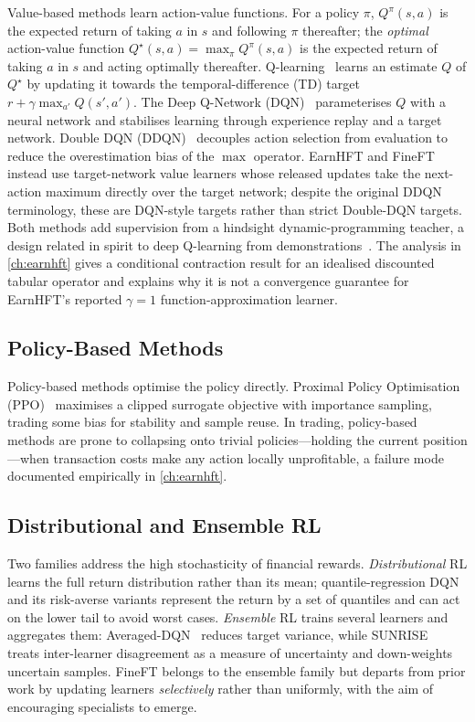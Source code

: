 Value-based methods learn action-value functions. For a policy $\pi$, $Q^\pi(s,a)$ is the expected return of taking $a$ in $s$ and following $\pi$ thereafter; the \emph{optimal} action-value function $Q^\star(s,a)=\max_\pi Q^\pi(s,a)$ is the expected return of taking $a$ in $s$ and acting optimally thereafter. Q-learning~\cite{watkins1992qlearning} learns an estimate $Q$ of $Q^\star$ by updating it towards the temporal-difference (TD) target $r+\gamma\max_{a'}Q(s',a')$. The Deep Q-Network (DQN)~\cite{mnih2015human} parameterises $Q$ with a neural network and stabilises learning through experience replay and a target network. Double DQN (DDQN)~\cite{van2016deep} decouples action selection from evaluation to reduce the overestimation bias of the $\max$ operator. EarnHFT and FineFT instead use target-network value learners whose released updates take the next-action maximum directly over the target network; despite the original DDQN terminology, these are DQN-style targets rather than strict Double-DQN targets. Both methods add supervision from a hindsight dynamic-programming teacher, a design related in spirit to deep Q-learning from demonstrations~\cite{hester2018dqfd}. The analysis in \cref{ch:earnhft} gives a conditional contraction result for an idealised discounted tabular operator and explains why it is not a convergence guarantee for EarnHFT's reported $\gamma=1$ function-approximation learner.

\subsection{Policy-Based Methods}
\label{sec:bg_policy}

Policy-based methods optimise the policy directly. Proximal Policy Optimisation (PPO)~\cite{schulman2017proximal} maximises a clipped surrogate objective with importance sampling, trading some bias for stability and sample reuse. In trading, policy-based methods are prone to collapsing onto trivial policies---holding the current position---when transaction costs make any action locally unprofitable, a failure mode documented empirically in \cref{ch:earnhft}.

\subsection{Distributional and Ensemble RL}
\label{sec:bg_dist_ensemble}

Two families address the high stochasticity of financial rewards. \emph{Distributional} RL learns the full return distribution rather than its mean; quantile-regression DQN~\cite{dabney2018distributional} and its risk-averse variants represent the return by a set of quantiles and can act on the lower tail to avoid worst cases. \emph{Ensemble} RL trains several learners and aggregates them: Averaged-DQN~\cite{anschel2017averaged} reduces target variance, while SUNRISE~\cite{lee2021sunrise} treats inter-learner disagreement as a measure of uncertainty and down-weights uncertain samples. FineFT belongs to the ensemble family but departs from prior work by updating learners \emph{selectively} rather than uniformly, with the aim of encouraging specialists to emerge.

